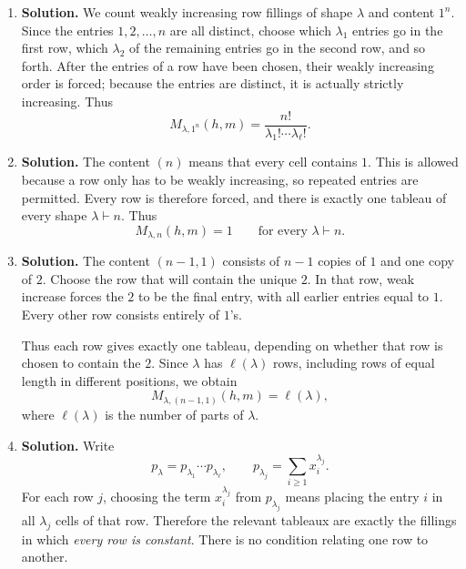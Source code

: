 \documentclass{article}
\begin{document}
\begin{enumerate}
\begin{enumerate}
\begin{enumerate}
\item They may be in different long rows.  There are $2$ ways to
decide which long row contains $3$.  If both companions are $1$, the
one-cell rows can be filled in $4$ ways; if both are $2$, there are
$4$ ways; and if the companions are different, there are $2$ choices
for their assignment and $6$ fillings of the one-cell rows.  This gives
\[
2(4+4+2\cdot6)=40.
\]
\end{enumerate}
Thus this case contributes $28+40=68$.
\end{enumerate}

Adding all three cases gives
\[
\boxed{M_{(2^2,1^4),(3^2,1^2)}(h,m)=120+224+68=412.}
\]

\item \textbf{Solution.}
We count weakly increasing row fillings of shape $\lambda$ and content
$1^n$.  Since the entries $1,2,\ldots,n$ are all distinct, choose
which $\lambda_1$ entries go in the first row, which $\lambda_2$ of
the remaining entries go in the second row, and so forth.  After the
entries of a row have been chosen, their weakly increasing order is
forced; because the entries are distinct, it is actually strictly
increasing.  Thus
\[
\boxed{M_{\lambda,1^n}(h,m)
=\frac{n!}{\lambda_1!\cdots\lambda_\ell!}.}
\]

\item \textbf{Solution.}
The content $(n)$ means that every cell contains $1$.  This is allowed
because a row only has to be weakly increasing, so repeated entries
are permitted.  Every row is therefore forced, and there is exactly
one tableau of every shape $\lambda\vdash n$.  Thus
\[
\boxed{M_{\lambda,n}(h,m)=1}
\qquad\text{for every }\lambda\vdash n.
\]

\item \textbf{Solution.}
The content $(n-1,1)$ consists of $n-1$ copies of $1$ and one copy of
$2$.  Choose the row that will contain the unique $2$.  In that row,
weak increase forces the $2$ to be the final entry, with all earlier
entries equal to $1$.  Every other row consists entirely of $1$'s.

Thus each row gives exactly one tableau, depending on whether that row
is chosen to contain the $2$.  Since $\lambda$ has $\ell(\lambda)$
rows, including rows of equal length in different positions, we obtain
\[
\boxed{M_{\lambda,(n-1,1)}(h,m)=\ell(\lambda),}
\]
where $\ell(\lambda)$ is the number of parts of $\lambda$.

\item \textbf{Solution.}
Write
\[
p_\lambda=p_{\lambda_1}\cdots p_{\lambda_\ell},
\qquad
p_{\lambda_j}=\sum_{i\geq1}x_i^{\lambda_j}.
\]
For each row $j$, choosing the term $x_i^{\lambda_j}$ from
$p_{\lambda_j}$ means placing the entry $i$ in all $\lambda_j$ cells
of that row.  Therefore the relevant tableaux are exactly the fillings
in which \emph{every row is constant}.  There is no condition relating
one row to another.


\end{enumerate}
\end{document}
